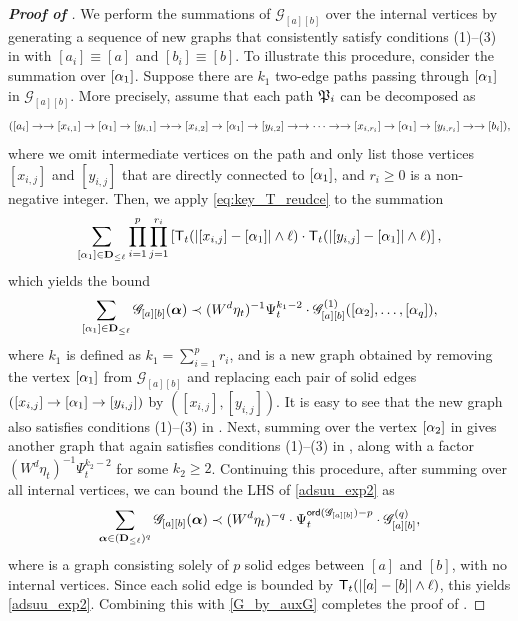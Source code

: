 \begin{proof}[\bf Proof of ]
We perform the summations of $\mathscr G_{[a][b]}$ over the internal vertices by generating a sequence of new graphs that consistently satisfy conditions (1)--(3) in  with $[a_i]\equiv [a]$ and $[b_i]\equiv [b]$. To illustrate this procedure, consider the summation over $[\alpha_1]$. Suppose there are $k_1$ two-edge paths passing through $[\alpha_1]$ in $\mathscr G_{[a][b]}$. More precisely, assume that each path $\mathfrak{P}_i$ can be decomposed as
\[([a_i]\to \to [x_{i,1}]\to [\alpha_1] \to [y_{i,1}] \to \to [x_{i,2}]\to[\alpha_1]\to [y_{i,2}]\to \to \cdots \to \to [x_{i,r_{i}}]\to[\alpha_1]\to [y_{i,r_{i}}]\to \to [b_i]),\]
where we omit intermediate vertices on the path and only list those vertices $[x_{i,j}]$ and $[y_{i,j}]$ that are directly connected to $[\alpha_1]$, and $r_i\ge 0$ is a non-negative integer. Then, we apply \eqref{eq:key_T_reudce} to the summation 
\begin{align}\nonumber
 \sum_{[\alpha_1]\in {\mathbf{D}}_{\le \ell}} \prod_{i=1}^p\prod_{j=1}^{r_i}  \left[{{\mathsf T}_{t}(|[x_{i,j}]-[\alpha_1]|\wedge \ell) \cdot {\mathsf T}_{t}(|[y_{i,j}]-[\alpha_1]|\wedge \ell)}\right] ,
\end{align}
which yields the bound
\[\sum_{[\alpha_1]\in {\mathbf{D}}_{\le \ell}}\mathscr G_{[a][b]}({\boldsymbol{\alpha}}) \prec (W^d\eta_t)^{-1} \Psi_t^{k_1-2} \cdot \mathscr G^{(1)}_{[a][b]}([\alpha_2],\ldots,[\alpha_q]) ,\] 
where $k_1$ is defined as $k_1=\sum_{i=1}^p r_i$, %
and  is a new graph obtained by removing the vertex $[\alpha_1]$ from $\mathscr G_{[a][b]}$ and replacing each pair of solid edges $([x_{i,j}]\to[\alpha_1]\to [y_{i,j}])$ by $([x_{i,j}], [y_{i,j}])$.  
It is easy to see that the new graph  also satisfies conditions (1)--(3) in . Next, summing over the vertex $[\alpha_2]$ in  gives another graph  that again satisfies conditions (1)--(3) in , along with a factor $(W^d\eta_t)^{-1} \Psi_t^{k_2-2}$ for some $k_2\ge 2$. 
Continuing this procedure, after summing over all internal vertices, we can bound the LHS of \eqref{adsuu_exp2} as  
\[\sum_{{\boldsymbol{\alpha}}\in ({\mathbf{D}}_{\le \ell})^q}\mathscr G_{[a][b]}({\boldsymbol{\alpha}})\prec (W^d\eta_t)^{-q}\cdot \Psi_t^{{\mathsf{ord}}(\mathscr G_{[a][b]})-p}\cdot \mathscr G^{(q)}_{[a][b]},\]
where  is a graph consisting solely of $p$ solid edges between $[a]$ and $[b]$, with no internal vertices. 
Since each solid edge is bounded by ${\mathsf T}_{t}(|[a]-[b]|\wedge \ell)$, this yields \eqref{adsuu_exp2}. Combining this with \eqref{G_by_auxG} completes the proof of . 
\end{proof}



